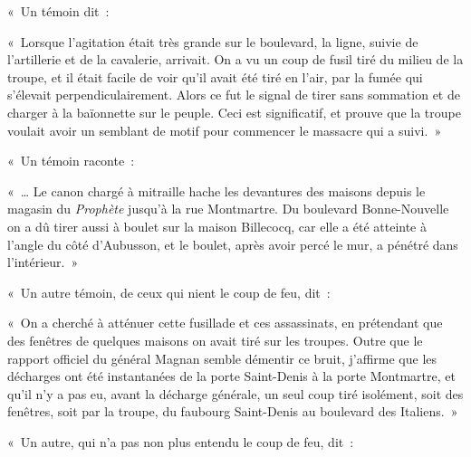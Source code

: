 \documentclass[french,twoside]{book} %
\newenvironment{quoteblock}%
  {\begin{quoting}}
  {\end{quoting}}
\newenvironment{quotebar}{%
    \def\FrameCommand{{\color{rubric!10!}\vrule width 0.5em} \hspace{0.9em}}%
    \def\OuterFrameSep{0pt} %
    \MakeFramed {\advance\hsize-\width \FrameRestore}
  }%
  {%
    \endMakeFramed
  }
\renewenvironment{quoteblock}%
  {%
    \savenotes
    \setstretch{0.9}
    \begin{quotebar}
    \smallskip
  }
  {%
    \smallskip
    \end{quotebar}
    \spewnotes
  }
\begin{document}
« Un témoin dit :\par

\begin{quoteblock}
 \noindent « Lorsque l’agitation était très grande sur le boulevard, la ligne, suivie de l’artillerie et de la cavalerie, arrivait. On a vu un coup de fusil tiré du milieu de la troupe, et il était facile de voir qu’il avait été tiré en l’air, par la fumée qui s’élevait perpendiculairement. Alors ce fut le signal de tirer sans sommation et de charger à la baïonnette sur le peuple. Ceci est significatif, et prouve que la troupe voulait avoir un semblant de motif pour commencer le massacre qui a suivi. »
 \end{quoteblock}

« Un témoin raconte :\par

\begin{quoteblock}
 \noindent « … Le canon chargé à mitraille hache les devantures des maisons depuis le magasin du \emph{Prophète} jusqu’à la rue Montmartre. Du boulevard Bonne-Nouvelle on a dû tirer aussi à boulet sur la maison Billecocq, car elle a été atteinte à l’angle du côté d’Aubusson, et le boulet, après avoir percé le mur, a pénétré dans l’intérieur. »
 \end{quoteblock}

« Un autre témoin, de ceux qui nient le coup de feu, dit :\par

\begin{quoteblock}
 \noindent « On a cherché à atténuer cette fusillade et ces assassinats, en prétendant que des fenêtres de quelques maisons on avait tiré sur les troupes. Outre que le rapport officiel du général Magnan semble démentir ce bruit, j’affirme que les décharges ont été instantanées de la porte Saint-Denis à la porte Montmartre, et qu’il n’y a pas eu, avant la décharge générale, un seul coup tiré isolément, soit des fenêtres, soit par la troupe, du faubourg Saint-Denis au boulevard des Italiens. »
 \end{quoteblock}

« Un autre, qui n’a pas non plus entendu le coup de feu, dit :\par
\end{document}
